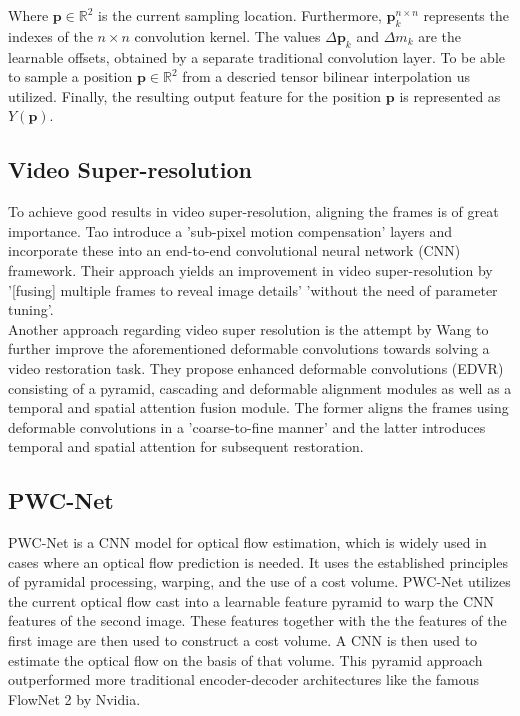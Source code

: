 \documentclass[10pt,twocolumn,letterpaper]{article}
\newcommand{\Vector}[1]{\boldsymbol{#1}}
\newcommand{\Set}[1]{\mathbb{#1}}
\begin{document}
Where $\Vector{p}\in\Set{R}^2$ is the current sampling location. Furthermore, $\Vector{p}_{k}^{n\times n}$ represents the indexes of the $n\times n$ convolution kernel. The values $\Delta\Vector{p}_{k}$ and $\Delta m_{k}$ are the learnable offsets, obtained by a separate traditional convolution layer. To be able to sample a position $\Vector{p}\in\Set{R}^2$ from a descried tensor bilinear interpolation us utilized. Finally, the resulting output feature for the position $\Vector{p}$ is represented as $Y\left(\Vector{p}\right)$. \cite{deformableconv}

\subsection{Video Super-resolution}
To achieve good results in video super-resolution, aligning the frames is of great importance. Tao \etal \cite{valillasuperres} introduce a 'sub-pixel motion compensation' layers and incorporate these into an end-to-end convolutional neural network (CNN) framework. Their approach yields an improvement in video super-resolution by '[fusing] multiple frames to reveal image details' 'without the need of parameter tuning'. \cite{valillasuperres}\\

Another approach regarding video super resolution is the attempt by Wang \etal \cite{deformablesuperres} to further improve the aforementioned deformable convolutions towards solving a video restoration task. They propose enhanced deformable convolutions (EDVR) consisting of a pyramid, cascading and deformable alignment modules as well as a temporal and spatial attention fusion module. The former aligns the frames using deformable convolutions in a 'coarse-to-fine manner' and the latter introduces temporal and spatial attention for subsequent restoration. \cite{deformablesuperres}

\subsection{PWC-Net}
PWC-Net \cite{pwcnet} is a CNN model for optical flow estimation, which is widely used in cases where an optical flow prediction is needed. It uses the established principles of pyramidal processing, warping, and the use of a cost volume. PWC-Net utilizes the current optical flow cast into a learnable feature pyramid to warp the CNN features of the second image. These features together with the the features of the first image are then used to construct a cost volume. A CNN is then used to estimate the optical flow on the basis of that volume. This pyramid approach outperformed more traditional encoder-decoder architectures like the famous FlowNet 2 \cite{flownet2} by Nvidia. \cite{pwcnet}
\end{document}
